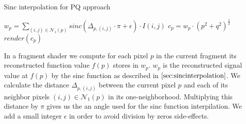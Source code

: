 \begin{algorithm}[H]
  \caption{Sinc interpolation for PQ approach}
  \begin{algorithmic}
      \State $w_p = \sum_{(i,j) \in \mathcal{N}_{1}(p)} sinc(\Delta_{p,(i,j)} \cdot \pi + \epsilon) \cdot I(i,j)$
      \State $c_p = w_p \cdot (p^2 + q^2)^{\frac{1}{2}}$
      \State $render(c_p)$
    \EndFor
  \end{algorithmic}
  \label{alg:sincinterpolation}
\end{algorithm}

In a fragment shader we compute for each pixel $p$ in the current fragment its reconstructed function value $f(p)$ stores in $w_p$. $w_p$ is the reconstructed signal value at $f(p)$ by the sinc function as described in $\ref{sec:sincinterpolation}$.
We calculate the distance $\Delta_{p,(i,j)}$ between the current pixel $p$ and each of its neighbor pixels $(i,j) \in \mathcal{N}_{1}(p)$ in its one-neighborhood. Multiplying this distance by $\pi$ gives us the an angle used for the sinc function interpilation. We add a small integer $\epsilon$ in order to avoid division by zeros side-effects.

